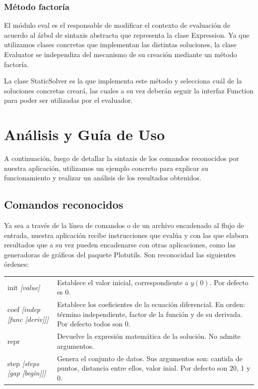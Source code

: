 \documentclass[a4paper]{article}
\begin{document}
\subsubsection{Método factoría}

El módulo {\ttfamily eval} es el responsable de modificar el
contexto de evaluación de acuerdo al árbol de sintaxis abstracta
que representa la clase {\ttfamily Expression}. Ya que utilizamos
clases concretas que implementan las distintas soluciones, la 
clase {\ttfamily Evaluator} se independiza del mecanismo de su 
creación mediante un método factoría.

La clase {\ttfamily StaticSolver} es la que implementa este 
método y selecciona cuál de la soluciones concretas creará,
las cuales a su vez deberán seguir la interfaz {\ttfamily Function}
para poder ser utilizadas por el evaluador.

\section{Análisis y Guía de Uso}

A continuación, luego de detallar la sintaxis de los comandos
reconocidos por nuestra aplicación, utilizamos un ejemplo concreto
para explicar su funcionamiento y realizar un análisis de los 
resultados obtenidos.

\subsection{Comandos reconocidos}

Ya sea a través de la línea de comandos o de un archivo encadenado
al flujo de entrada, nuestra aplicación recibe instrucciones que 
evalúa y con las que elabora resultados que a su vez pueden 
encadenarse con otras aplicaciones, como las generadoras de gráficos del 
paquete Plotutils. Son reconocidad las siguientes órdenes:

\begin{center}
\begin{tabular}{l p{}}
    {\ttfamily init \textit{[value]}} & Establece el valor 
        inicial, correspondiente a $y(0)$. Por defecto es 0. \\
    {\ttfamily coef \textit{[indep [func [deriv]]]}} & Establece 
        los coeficientes de la ecuación diferencial. En orden: 
        término independiente, factor de la función y de su 
        derivada. Por defecto todos son 0.\\
    {\ttfamily repr} & Devuelve la expresión matemática de la 
        solución. No admite argumentos.\\
    {\ttfamily step \textit{[steps [gap [begin]]]}} & Genera 
        el conjunto de datos. Sus argumentos son: cantida de 
        puntos, distancia entre ellos, valor inial. Por 
        defecto son 20, 1 y 0.
\end{tabular}
\end{center}
\end{document}
